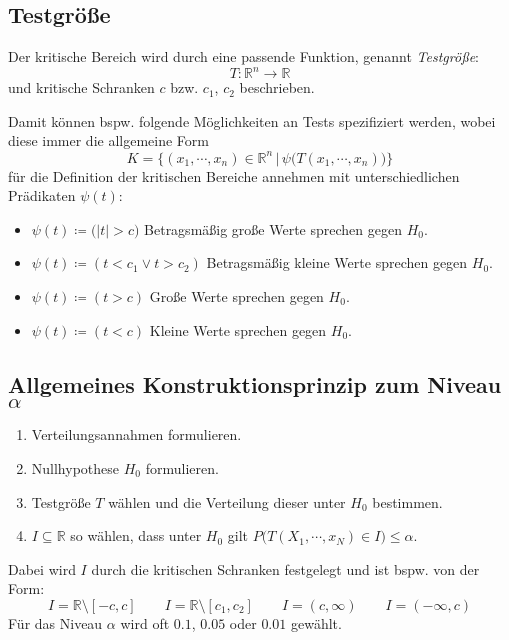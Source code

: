 \documentclass[a4paper, 11pt, accentcolor = tud3b]{tudreport}
\newcommand{\forwhich}{\ensuremath{{\,\vert\,}}}
\newcommand{\abs}[1]{\ensuremath{{\lvert #1 \rvert}}}
\newcommand{\R}{\ensuremath{\mathbb{R}}}
\begin{document}
            \subsection{Testgröße}
                Der kritische Bereich wird durch eine passende Funktion, genannt \textit{Testgröße}:
                \begin{equation*}
	                T : \R^n \rightarrow \R
                \end{equation*}
                und kritische Schranken \(c\) bzw. \(c_1\), \(c_2\) beschrieben.
                
                Damit können bspw. folgende Möglichkeiten an Tests spezifiziert werden, wobei diese immer die allgemeine Form \[ K = \Big\{ (x_1, \cdots, x_n) \in \R^n \forwhich \psi\big(T(x_1, \cdots, x_n)\big) \Big\} \] für die Definition der kritischen Bereiche annehmen mit unterschiedlichen Prädikaten \( \psi(t) \):
                \begin{itemize}
                	\item \( \psi(t) \coloneqq \big(\abs{t} > c\big) \)  \tabto{4.5cm} Betragsmäßig große Werte sprechen gegen \(H_0\).
                	\item \( \psi(t) \coloneqq (t < c_1 \lor t > c_2) \) \tabto{4.5cm} Betragsmäßig kleine Werte sprechen gegen \(H_0\).
                	\item \( \psi(t) \coloneqq (t > c) \)                \tabto{4.5cm} Große Werte sprechen gegen \(H_0\).
                	\item \( \psi(t) \coloneqq (t < c) \)                \tabto{4.5cm} Kleine Werte sprechen gegen \(H_0\).
                \end{itemize}

            \subsection{Allgemeines Konstruktionsprinzip zum Niveau \(\alpha\)}
                \begin{enumerate}
                	\item Verteilungsannahmen formulieren.
                	\item Nullhypothese \(H_0\) formulieren.
                	\item Testgröße \(T\) wählen und die Verteilung dieser unter \(H_0\) bestimmen.
                	\item \(I \subseteq \R \) so wählen, dass unter \(H_0\) gilt \( P\big(T(X_1, \cdots, x_N) \in I\big) \leq \alpha \).
                \end{enumerate}
	            Dabei wird \(I\) durch die kritischen Schranken festgelegt und ist bspw. von der Form:
	            \begin{equation*}
		            I = \R \setminus [-c, c] \qquad I = \R \setminus [c_1, c_2] \qquad I = (c, \infty) \qquad I = (-\infty, c)
	            \end{equation*}
	            Für das Niveau \( \alpha \) wird oft \( 0.1\), \(0.05\) oder \(0.01 \) gewählt.
\end{document}
